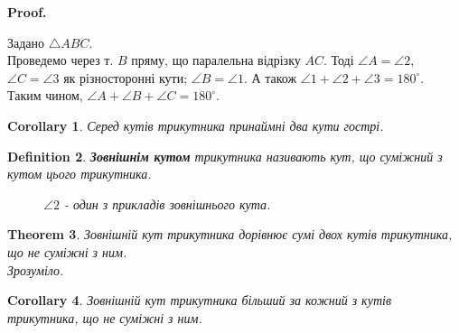 \documentclass[a4paper, 10pt]{article}
\makeatletter
\theoremstyle{theoremdd}
\newtheorem{theorem}{Theorem}[subsection]
\theoremstyle{theoremdd}
\theoremstyle{theoremdd}
\newtheorem{definition}[theorem]{Definition}
\theoremstyle{theoremdd}
\theoremstyle{theoremdd}
\theoremstyle{theoremdd}
\theoremstyle{theoremdd}
\theoremstyle{theoremdd}
\theoremstyle{theoremdd}
\newtheorem{corollary}[theorem]{Corollary}
\renewenvironment{proof}[1][Proof.\\]{\par
\pushQED{\hfill \qed}%
\normalfont \topsep6\p@\@plus6\p@\relax
\trivlist
\item\relax
{\bfseries
#1\@addpunct{.}}\hspace\labelsep\ignorespaces
}{%
\popQED\endtrivlist\@endpefalse
}
\makeatother
\begin{document}
\begin{proof}
Задано $\triangle ABC$.\\
Проведемо через т. $B$ пряму, що паралельна відрізку $AC$. Тоді $\angle A = \angle 2$, $\angle C = \angle 3$ як різносторонні кути; $\angle B = \angle 1$. А також $\angle 1 + \angle 2 + \angle 3 = 180^\circ$.\\
Таким чином, $\angle A + \angle B + \angle C = 180^\circ$.
\begin{figure}[H]
\centering
{}
\end{figure}
\end{proof}

\begin{corollary}
Серед кутів трикутника принаймні два кути гострі.
\end{corollary}

\begin{definition}
\textbf{Зовнішнім кутом} трикутника називають кут, що суміжний з кутом цього трикутника.
\begin{figure}[H]
\centering
{}
\caption*{$\angle 2$ - один з прикладів зовнішнього кута.}
\end{figure}
\end{definition}

\begin{theorem}
Зовнішній кут трикутника дорівнює сумі двох кутів трикутника, що не суміжні з ним.\\
\textit{Зрозуміло.}
\end{theorem}

\begin{corollary}
Зовнішній кут трикутника більший за кожний з кутів трикутника, що не суміжні з ним.
\end{corollary}
\end{document}
